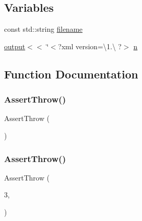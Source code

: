 \subsection*{Variables}
\begin{DoxyCompactItemize}
\item 
const std\+::string \hyperlink{a00623_a42a21beb8018ac623f4d09db1343b9cf}{filename}
\item 
\hyperlink{a00623_a934120182a1459d17613528940e2bc61}{output}$<$$<$ \char`\"{}$<$?xml version=\textbackslash{}1.\textbackslash{} ?$>$ \hyperlink{a00623_a781a04ab095280f838ff3eb0e51312e0}{n}
\end{DoxyCompactItemize}


\subsection{Function Documentation}
\mbox{\label{a00623_a2b1bf74c066621ba811fd8bc87bc0dba}} 
\subsubsection{\texorpdfstring{Assert\+Throw()}{AssertThrow()}\hspace{0.1cm}{\footnotesize\ttfamily [1/2]}}
{\footnotesize\ttfamily Assert\+Throw (\begin{DoxyParamCaption}{ }\end{DoxyParamCaption})}

\mbox{\label{a00623_a2641c21aa7765f6d1dff5c8b213e99dc}} 
\subsubsection{\texorpdfstring{Assert\+Throw()}{AssertThrow()}\hspace{0.1cm}{\footnotesize\ttfamily [2/2]}}
{\footnotesize\ttfamily Assert\+Throw (\begin{DoxyParamCaption}\item[{std\+\_\+cxx11\+::get$<$ 1 $>$(vector\+\_\+data\+\_\+ranges\mbox{[}n\+\_\+th\+\_\+vector\mbox{]})+1 -\/ std\+\_\+cxx11\+::get$<$ 0 $>$(vector\+\_\+data\+\_\+ranges\mbox{[}n\+\_\+th\+\_\+vector\mbox{]})$<$=}]{3,  }\item[{Exc\+Message(\char`\"{}Can\textquotesingle{}t declare a vector with more than 3 components \char`\"{} \char`\"{}in V\+TK\char`\"{})}]{ }\end{DoxyParamCaption})}

